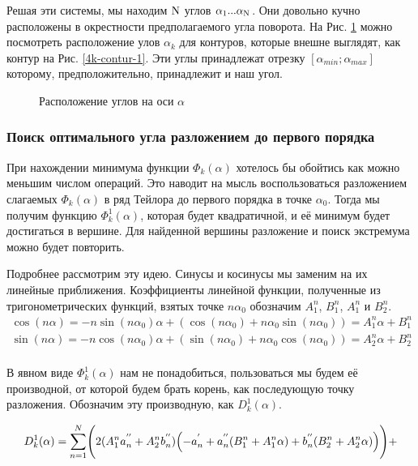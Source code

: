 \documentclass[a4paper,12pt, titlepage]{article}
\begin{document}
Решая эти системы, мы находим $\rm N$ углов ${\alpha}_{1}...{\alpha}_{\rm N}$. Они довольно кучно расположены в окрестности 
предполагаемого угла поворота. На Рис. \ref{4k-alpha} можно посмотреть расположение улов ${\alpha}_{k}$ для контуров, которые внешне выглядят, как контур на Рис. \ref{4k-contur-1}. Эти углы принадлежат отрезку $[ {\alpha}_{min};{\alpha}_{max} ]$ 
которому, предположительно, принадлежит и наш угол.
\begin{figure}[h]
\noindent{}
\caption{Расположение углов на оси $\alpha$}
\label{4k-alpha}
\end{figure}

\subsubsection{Поиск оптимального угла разложением до первого порядка}
При нахождении минимума функции $\Phi_{k}(\alpha)$ хотелось  бы обойтись как можно меньшим числом операций. Это наводит на мысль 
воспользоваться разложением слагаемых $\Phi_{k}(\alpha)$ в ряд Тейлора до первого порядка в точке ${\alpha}_{0}$. Тогда мы получим 
функцию $\Phi_{k}^{1}(\alpha)$, которая будет квадратичной, и её минимум будет достигаться в вершине.  Для найденной вершины 
разложение и поиск экстремума можно  будет повторить. 

Подробнее рассмотрим эту идею. Синусы и косинусы мы заменим на их линейные приближения. Коэффициенты линейной функции, полученные 
из тригонометрических функций, взятых точке $n{\alpha}_{0}$ обозначим  $A^{n}_{1}$, $B^{n}_{1}$,  $A^{n}_{1}$ и $B^{n}_{2}$.
\[ 
 		\begin{aligned}
  		\cos(n\alpha) = -n\sin(n\alpha_{0})\alpha + (\cos(n\alpha_{0}) + n\alpha_{0}\sin(n\alpha_{0})) = A^{n}_{1}\alpha + B^{n}_{1}\\
 		\sin(n\alpha) = -n\cos(n\alpha_{0})\alpha + (\sin(n\alpha_{0}) + n\alpha_{0}\cos(n\alpha_{0})) = A^{n}_{2}\alpha + B^{n}_{2}\\
		\end{aligned}
\]

В явном виде $\Phi_{k}^{1}(\alpha)$ нам не понадобиться, пользоваться мы будем её производной, от которой будем брать корень, как 
последующую точку разложения. Обозначим эту производную, как $D_{k}^{1}(\alpha)$.

$$
D_{k}^{1}(\alpha) = \sum \limits_{n=1}^{N} 
	\Biggl(
		2(A^{n}_{1}a^{''}_{n} + A^{n}_{2}b^{''}_{n}) 
			\Bigl( 
				-a^{'}_{n} + a^{''}_{n}(B^{n}_{1} + A^{n}_{1}\alpha) + b^{''}_{n}(B^{n}_{2} + A^{n}_{2}\alpha)
			\Bigr) 
	\Biggr) +
$$
\end{document}
